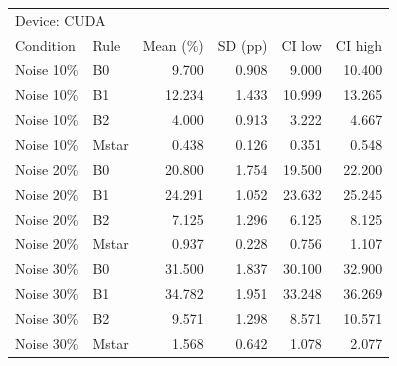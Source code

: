 \begin{tabular}{llrrrr}
\toprule
\multicolumn{6}{l}{Device: CUDA} \\
Condition & Rule & Mean (\%) & SD (pp) & CI low & CI high \\
\midrule
Noise 10\% & B0 & 9.700 & 0.908 & 9.000 & 10.400 \\
Noise 10\% & B1 & 12.234 & 1.433 & 10.999 & 13.265 \\
Noise 10\% & B2 & 4.000 & 0.913 & 3.222 & 4.667 \\
Noise 10\% & Mstar & 0.438 & 0.126 & 0.351 & 0.548 \\
Noise 20\% & B0 & 20.800 & 1.754 & 19.500 & 22.200 \\
Noise 20\% & B1 & 24.291 & 1.052 & 23.632 & 25.245 \\
Noise 20\% & B2 & 7.125 & 1.296 & 6.125 & 8.125 \\
Noise 20\% & Mstar & 0.937 & 0.228 & 0.756 & 1.107 \\
Noise 30\% & B0 & 31.500 & 1.837 & 30.100 & 32.900 \\
Noise 30\% & B1 & 34.782 & 1.951 & 33.248 & 36.269 \\
Noise 30\% & B2 & 9.571 & 1.298 & 8.571 & 10.571 \\
Noise 30\% & Mstar & 1.568 & 0.642 & 1.078 & 2.077 \\
\bottomrule
\end{tabular}
